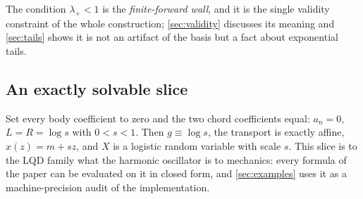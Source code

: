 The condition $\lambda_+<1$ is the \emph{finite-forward wall}, and it is
the single validity constraint of the whole construction;
\cref{sec:validity} discusses its meaning and \cref{sec:tails} shows it is
not an artifact of the basis but a fact about exponential tails.

\subsection{An exactly solvable slice}
\label{sec:constspeed}

Set every body coefficient to zero and the two chord coefficients equal:
$a_n=0$, $L=R=\log s$ with $0<s<1$.  Then $g\equiv\log s$, the transport is
exactly affine, $x(z)=m+sz$, and $X$ is a logistic random variable with
scale $s$.  This slice is to the LQD family what the harmonic oscillator is
to mechanics: every formula of the paper can be evaluated on it in closed
form, and \cref{sec:examples} uses it as a machine-precision audit of the
implementation.

